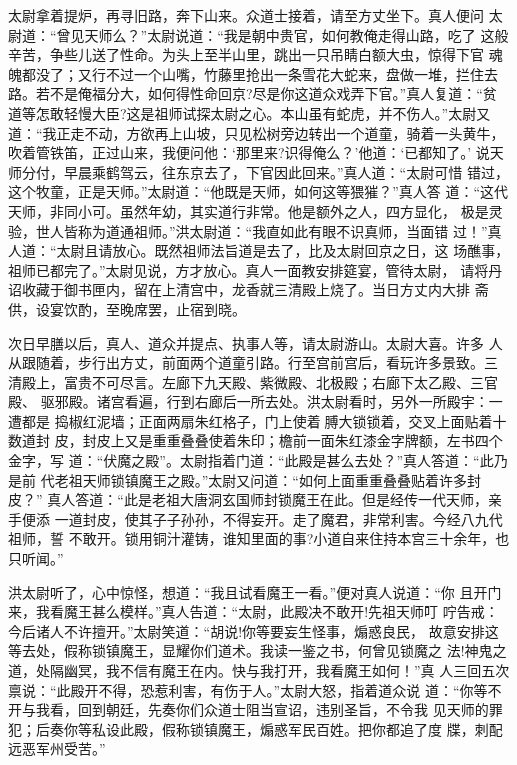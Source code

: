 太尉拿着提炉，再寻旧路，奔下山来。众道士接着，请至方丈坐下。真人便问
太尉道：“曾见天师么？”太尉说道：“我是朝中贵官，如何教俺走得山路，吃了
这般辛苦，争些儿送了性命。为头上至半山里，跳出一只吊睛白额大虫，惊得下官
魂魄都没了；又行不过一个山嘴，竹藤里抢出一条雪花大蛇来，盘做一堆，拦住去
路。若不是俺福分大，如何得性命回京?尽是你这道众戏弄下官。”真人复道：“贫
道等怎敢轻慢大臣?这是祖师试探太尉之心。本山虽有蛇虎，并不伤人。”太尉又
道：“我正走不动，方欲再上山坡，只见松树旁边转出一个道童，骑着一头黄牛，
吹着管铁笛，正过山来，我便问他：‘那里来?识得俺么？’他道：‘已都知了。’
说天师分付，早晨乘鹤驾云，往东京去了，下官因此回来。”真人道：“太尉可惜
错过，这个牧童，正是天师。”太尉道：“他既是天师，如何这等猥獕？”真人答
道：“这代天师，非同小可。虽然年幼，其实道行非常。他是额外之人，四方显化，
极是灵验，世人皆称为道通祖师。”洪太尉道：“我直如此有眼不识真师，当面错
过！”真人道：“太尉且请放心。既然祖师法旨道是去了，比及太尉回京之日，这
场醮事，祖师已都完了。”太尉见说，方才放心。真人一面教安排筵宴，管待太尉，
请将丹诏收藏于御书匣内，留在上清宫中，龙香就三清殿上烧了。当日方丈内大排
斋供，设宴饮酌，至晚席罢，止宿到晓。

次日早膳以后，真人、道众并提点、执事人等，请太尉游山。太尉大喜。许多
人从跟随着，步行出方丈，前面两个道童引路。行至宫前宫后，看玩许多景致。三
清殿上，富贵不可尽言。左廊下九天殿、紫微殿、北极殿；右廊下太乙殿、三官殿、
驱邪殿。诸宫看遍，行到右廊后一所去处。洪太尉看时，另外一所殿宇：一遭都是
捣椒红泥墙；正面两扇朱红格子，门上使着膊大锁锁着，交叉上面贴着十数道封
皮，封皮上又是重重叠叠使着朱印；檐前一面朱红漆金字牌额，左书四个金字，写
道：“伏魔之殿”。太尉指着门道：“此殿是甚么去处？”真人答道：“此乃是前
代老祖天师锁镇魔王之殿。”太尉又问道：“如何上面重重叠叠贴着许多封皮？”
真人答道：“此是老祖大唐洞玄国师封锁魔王在此。但是经传一代天师，亲手便添
一道封皮，使其子子孙孙，不得妄开。走了魔君，非常利害。今经八九代祖师，誓
不敢开。锁用铜汁灌铸，谁知里面的事?小道自来住持本宫三十余年，也只听闻。”

洪太尉听了，心中惊怪，想道：“我且试看魔王一看。”便对真人说道：“你
且开门来，我看魔王甚么模样。”真人告道：“太尉，此殿决不敢开!先祖天师叮
咛告戒：今后诸人不许擅开。”太尉笑道：“胡说!你等要妄生怪事，煽惑良民，
故意安排这等去处，假称锁镇魔王，显耀你们道术。我读一鉴之书，何曾见锁魔之
法!神鬼之道，处隔幽冥，我不信有魔王在内。快与我打开，我看魔王如何！”真
人三回五次禀说：“此殿开不得，恐惹利害，有伤于人。”太尉大怒，指着道众说
道：“你等不开与我看，回到朝廷，先奏你们众道士阻当宣诏，违别圣旨，不令我
见天师的罪犯；后奏你等私设此殿，假称锁镇魔王，煽惑军民百姓。把你都追了度
牒，刺配远恶军州受苦。”

